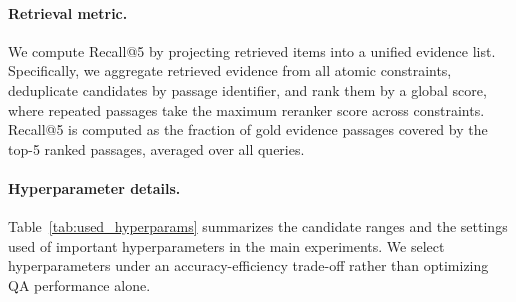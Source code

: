 \documentclass{article}
\theoremstyle{plain}
\theoremstyle{definition}
\theoremstyle{remark}
\begin{document}
\paragraph{Retrieval metric.}
We compute Recall@5 by projecting retrieved items into a unified evidence list. 
Specifically, we aggregate retrieved evidence from all atomic constraints, deduplicate candidates by passage identifier, and rank them by a global score, where repeated passages take the maximum reranker score across constraints. 
Recall@5 is computed as the fraction of gold evidence passages covered by the top-5 ranked passages, averaged over all queries.


\paragraph{Hyperparameter details.}
Table~\ref{tab:used_hyperparams} summarizes the candidate ranges and the settings used of important hyperparameters in the main experiments. 
We select hyperparameters under an accuracy-efficiency trade-off rather than optimizing QA performance alone. 
\end{document}
